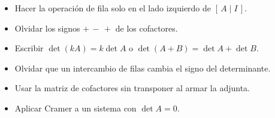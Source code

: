 \documentclass[11pt,a4paper]{article}
\begin{document}
\begin{ojo}
\begin{itemize}
\item Hacer la operación de fila solo en el lado izquierdo de $[\,A\mid I\,]$.
\item Olvidar los signos $+\,-\,+$ de los cofactores.
\item Escribir $\det(kA)=k\det A$ o $\det(A+B)=\det A+\det B$.
\item Olvidar que un intercambio de filas cambia el signo del determinante.
\item Usar la matriz de cofactores sin transponer al armar la adjunta.
\item Aplicar Cramer a un sistema con $\det A=0$.
\end{itemize}
\end{ojo}
\end{document}
